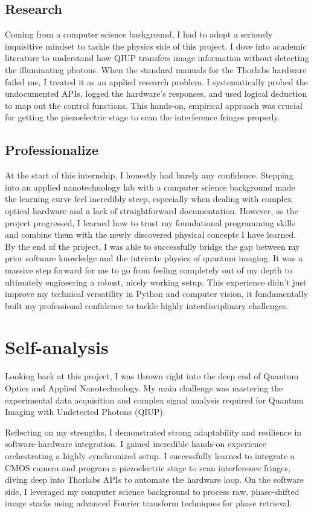 \documentclass[12pt,a4paper]{article}
\begin{document}
\subsection{Research}
Coming from a computer science background, I had to adopt a seriously inquisitive mindset to tackle the physics side of this project. I dove into academic literature to understand how QIUP transfers image information without detecting the illuminating photons. When the standard manuals for the Thorlabs hardware failed me, I treated it as an applied research problem. I systematically probed the undocumented APIs, logged the hardware's responses, and used logical deduction to map out the control functions. This hands-on, empirical approach was crucial for getting the piezoelectric stage to scan the interference fringes properly.

\subsection{Professionalize}
At the start of this internship, I honestly had barely any confidence. Stepping into an applied nanotechnology lab with a computer science background made the learning curve feel incredibly steep, especially when dealing with complex optical hardware and a lack of straightforward documentation. However, as the project progressed, I learned how to trust my foundational programming skills and combine them with the newly discovered physical concepts I have learned. By the end of the project, I was able to successfully bridge the gap between my prior software knowledge and the intricate physics of quantum imaging. It was a massive step forward for me to go from feeling completely out of my depth to ultimately engineering a robust, nicely working setup. This experience didn't just improve my technical versatility in Python and computer vision, it fundamentally built my professional confidence to tackle highly interdisciplinary challenges.

\newpage
\section{Self-analysis}

Looking back at this project, I was thrown right into the deep end of Quantum Optics and Applied Nanotechnology. My main challenge was mastering the experimental data acquisition and complex signal analysis required for Quantum Imaging with Undetected Photons (QIUP).

Reflecting on my strengths, I demonstrated strong adaptability and resilience in software-hardware integration. I gained incredible hands-on experience orchestrating a highly synchronized setup. I successfully learned to integrate a CMOS camera and program a piezoelectric stage to scan interference fringes, diving deep into Thorlabs APIs to automate the hardware loop. On the software side, I leveraged my computer science background to process raw, phase-shifted image stacks using advanced Fourier transform techniques for phase retrieval.
\end{document}
